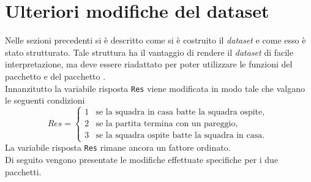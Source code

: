 \begin{comment}
	
	
	\section{Ulteriori modifiche del dataset}
	
	Nelle sezioni precedenti si è descritto come si è costruito il dataset e come esso è stato strutturato. Tale struttura ha il vantaggio di rendere il dataset di facile interpretazione, ma deve essere riadattato per poter utilizzare le funzioni del pacchetto \texttt{BradleyTerry2}.\\ 
	Sono state apportare le seguenti modifiche.\\
	
	Innanzitutto il modello richiede che le due variabili \texttt{Team} e \texttt{Vs} siano di tipo fattore oppure costituiscano un \textsf{data.frame}. Un \textsf{data.frame} è una raccolta di vettori di osservazioni, che devono avere tutti la stessa lunghezza, ma possono essere di tipo diverso: variabili nominali (fattori) o variabili numeriche.
	Le variabili \textsf{Team} e \textsf{Vs} sono state trasformate in \texttt{data.frame} in modo da poter inserire al loro interno tutte le covariate descritte nella sezione precedente.
	
	Inoltre i valori della variabile \texttt{AtHome} sono stati converti in 1 (se \texttt{TRUE}) mentre in 0 (se \texttt{FALSE}).
	
\end{comment}
\pagebreak
\section{Ulteriori modifiche del dataset}

Nelle sezioni precedenti si è descritto come si è costruito il \emph{dataset} e come esso è stato strutturato. Tale struttura ha il vantaggio di rendere il \emph{dataset} di facile interpretazione, ma deve essere riadattato per poter utilizzare le funzioni del pacchetto \textit{\cite{bt2}} e del pacchetto \textit{\cite{btl}}.\\ 
Innanzitutto la variabile risposta \texttt{Res} viene modificata in modo tale che valgano le seguenti condizioni
\begin{equation}
	Res =
	\begin{cases}
		1 & \text{se la squadra in casa batte la squadra ospite,}\\
		2 & \text{se la partita termina con un pareggio,}\\
		3 & \text{se la squadra ospite batte la squadra in casa. }
	\end{cases}       
\end{equation}
La variabile risposta \texttt{Res} rimane ancora un fattore ordinato.\\
Di seguito vengono presentate le modifiche effettuate specifiche per i due pacchetti.
